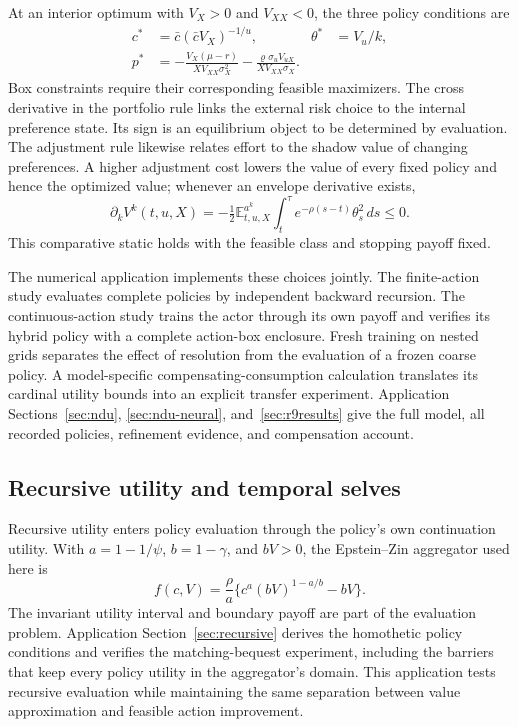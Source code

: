 \documentclass[ecta,nameyear,draft]{econsocart}
\theoremstyle{definition}
\theoremstyle{remark}
\newcommand{\E}{\mathbb E}
\begin{document}
At an interior optimum with $V_X>0$ and $V_{XX}<0$, the three policy conditions are
\begin{align}
 c^*&=\bar c(\bar c V_X)^{-1/u}, &
 \theta^*&=V_u/k,\nonumber\\
 p^*&=-\frac{V_X(\mu-r)}{XV_{XX}\sigma_X^2}
       -\frac{\varrho\sigma_u V_{uX}}{XV_{XX}\sigma_X}.\label{eq:scope-preference-policies}
\end{align}
Box constraints require their corresponding feasible maximizers. The cross derivative in the portfolio rule links the external risk choice to the internal preference state. Its sign is an equilibrium object to be determined by evaluation. The adjustment rule likewise relates effort to the shadow value of changing preferences. A higher adjustment cost lowers the value of every fixed policy and hence the optimized value; whenever an envelope derivative exists,
\begin{equation}\label{eq:scope-preference-envelope}
 \partial_k V^k(t,u,X)
 =-\tfrac12\E^{a^k}_{t,u,X}
   \int_t^\tau e^{-\rho(s-t)}\theta_s^2\,ds\leq0.
\end{equation}
This comparative static holds with the feasible class and stopping payoff fixed.

The numerical application implements these choices jointly. The finite-action study evaluates complete policies by independent backward recursion. The continuous-action study trains the actor through its own payoff and verifies its hybrid policy with a complete action-box enclosure. Fresh training on nested grids separates the effect of resolution from the evaluation of a frozen coarse policy. A model-specific compensating-consumption calculation translates its cardinal utility bounds into an explicit transfer experiment. Application Sections~\ref{sec:ndu}, \ref{sec:ndu-neural}, and~\ref{sec:r9results} give the full model, all recorded policies, refinement evidence, and compensation account.

\subsection{Recursive utility and temporal selves}
Recursive utility enters policy evaluation through the policy's own continuation utility. With $a=1-1/\psi$, $b=1-\gamma$, and $bV>0$, the Epstein--Zin aggregator used here is
\begin{equation}\label{eq:scope-recursive}
 f(c,V)=\frac\rho a\{c^a(bV)^{1-a/b}-bV\}.
\end{equation}
The invariant utility interval and boundary payoff are part of the evaluation problem. Application Section~\ref{sec:recursive} derives the homothetic policy conditions and verifies the matching-bequest experiment, including the barriers that keep every policy utility in the aggregator's domain. This application tests recursive evaluation while maintaining the same separation between value approximation and feasible action improvement.
\end{document}
